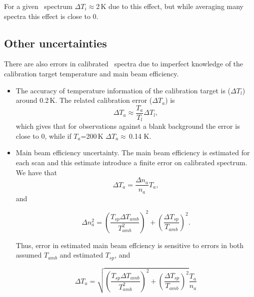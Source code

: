 For a given \smr\ spectrum \(\Delta T_{i}\)\(\approx\)2\,K due to this effect,
but while averaging many spectra this effect is close to 0.





\subsection{Other uncertainties}
\label{sec:otheruncer}

There are also errors in calibrated \smr\ spectra due to imperfect knowledge of
the calibration target temperature and main beam efficiency. 

\begin{itemize}

\item The accuracy of temperature information of the calibration target
 is (\(\Delta T_{l}\)) around 0.2\,K. The related calibration error (\(\Delta T_{a}\)) is
 \begin{equation}
  \Delta T_{a} \approx \frac{T_{a}}{T_{l}} \Delta T_{l},
 \end{equation}
 which gives that for observations against a blank background the error
 is close to 0, while if \(T_{a}\)=200\,K \(\Delta T_{a}\)\(\approx\)\,0.14 K.

\item Main beam efficiency uncertainty. The main beam efficiency is estimated
 for each scan and this estimate introduce a finite error on calibrated spectrum.
 We have that
 \begin{equation}
  \Delta T_{a} = \frac{\Delta n_{a}}{n_{a}}T_{a},
 \end{equation}
 and

 \begin{equation}
  \Delta n_{a}^{2} = \left(\frac{T_{sp}\Delta T_{amb}}{T_{amb}^{2}}\right)^{2} + 
                     \left( \frac{\Delta T_{sp}}{T_{amb}} \right)^2.
 \end{equation}

Thus, error in estimated main beam effciency is sensitive to errors in both assumed 
\(T_{amb}\) and estimated \(T_{sp}\), and 

\begin{equation}
  \Delta T_{a} = \sqrt{ \left(\frac{T_{sp}\Delta T_{amb}}{T_{amb}^{2}}\right)^{2} +
                     \left( \frac{\Delta T_{sp}}{T_{amb}} \right)^2 } \frac{T_{a}}{n_a}
\label{eq:tanaerr}
\end{equation}



\end{itemize}
